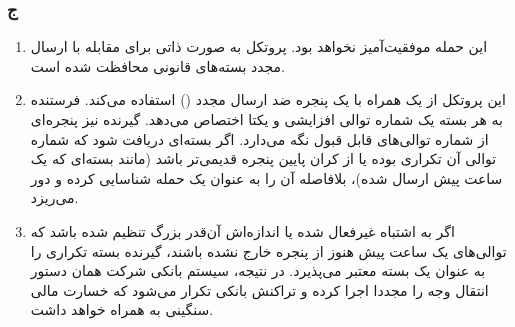 \subsubsection*{ج}
\begin{enumerate}
    \item  این حمله {موفقیت‌آمیز نخواهد بود}. پروتکل  به صورت ذاتی برای مقابله با ارسال مجدد بسته‌های قانونی محافظت شده است.
    \item  این پروتکل از یک {} همراه با یک {پنجره ضد ارسال مجدد ()} استفاده می‌کند. فرستنده به هر بسته یک شماره توالی افزایشی و یکتا اختصاص می‌دهد. گیرنده نیز پنجره‌ای از شماره توالی‌های قابل قبول نگه می‌دارد. اگر بسته‌ای دریافت شود که شماره توالی آن تکراری بوده یا از کران پایین پنجره قدیمی‌تر باشد (مانند بسته‌ای که یک ساعت پیش ارسال شده)، بلافاصله آن را به عنوان یک حمله  شناسایی کرده و دور می‌ریزد.
    \item اگر  به اشتباه غیرفعال شده یا اندازه‌اش آن‌قدر بزرگ تنظیم شده باشد که توالی‌های یک ساعت پیش هنوز از پنجره خارج نشده باشند، گیرنده بسته تکراری را به عنوان یک بسته معتبر می‌پذیرد. در نتیجه، سیستم بانکی شرکت همان دستور انتقال وجه را مجددا اجرا کرده و تراکنش بانکی {تکرار می‌شود} که خسارت مالی سنگینی به همراه خواهد داشت.
\end{enumerate}